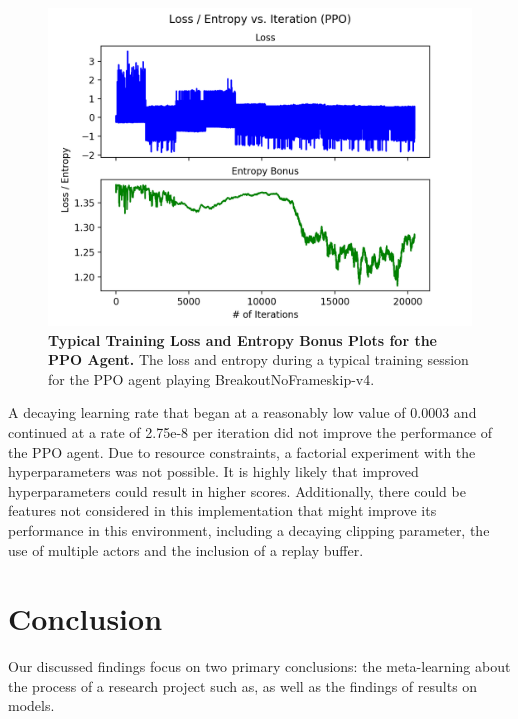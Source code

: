 \documentclass[conference]{IEEEtran}
\begin{document}
\begin{figure}[htbp]
\centerline{\includegraphics[scale=0.5]{PPO_Train_Loss_Entropy_Plot_Breakout_Typical.png}}
\caption{\textbf{Typical Training Loss and Entropy Bonus Plots for the PPO Agent.}  The loss and entropy during a typical training session for the PPO agent playing BreakoutNoFrameskip-v4.}
\label{fig:PPOTypicalTrainLossEntropyBreakout}
\end{figure}

A decaying learning rate that began at a reasonably low value of 0.0003 and continued at a rate of 2.75e-8 per iteration did not improve the performance of the PPO agent. Due to resource constraints, a factorial experiment with the hyperparameters was not possible. It is highly likely that improved hyperparameters could result in higher scores. Additionally, there could be features not considered in this implementation that might improve its performance in this environment, including a decaying clipping parameter, the use of multiple actors and the inclusion of a replay buffer.

\section{Conclusion} \label{conclusion}
Our discussed findings focus on two primary conclusions: the meta-learning about the process of a research project such as, as well as the findings of results on models.
\end{document}
